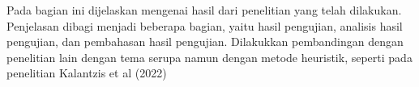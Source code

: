 Pada bagian ini dijelaskan mengenai hasil dari penelitian yang telah dilakukan. Penjelasan dibagi menjadi beberapa bagian, yaitu hasil pengujian, analisis hasil pengujian, dan pembahasan hasil pengujian. Dilakukkan pembandingan dengan penelitian lain dengan tema serupa namun dengan metode heuristik, seperti pada penelitian Kalantzis et al (2022)
